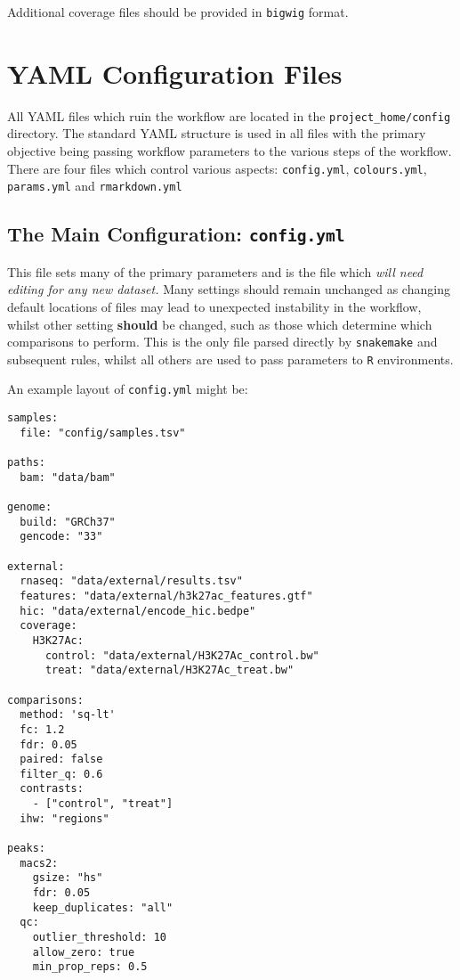 \documentclass[
]{book}
\begin{document}
Additional coverage files should be provided in \texttt{bigwig} format.

\hypertarget{editing-yaml}{%
\chapter{YAML Configuration Files}\label{editing-yaml}}

All YAML files which ruin the workflow are located in the \texttt{project\_home/config} directory.
The standard YAML structure is used in all files with the primary objective being passing workflow parameters to the various steps of the workflow.
There are four files which control various aspects: \texttt{config.yml}, \texttt{colours.yml}, \texttt{params.yml} and \texttt{rmarkdown.yml}

\hypertarget{config-yml}{%
\section{\texorpdfstring{The Main Configuration: \texttt{config.yml}}{The Main Configuration: config.yml}}\label{config-yml}}

This file sets many of the primary parameters and is the file which \emph{will need editing for any new dataset.}
Many settings should remain unchanged as changing default locations of files may lead to unexpected instability in the workflow, whilst other setting \textbf{should} be changed, such as those which determine which comparisons to perform.
This is the only file parsed directly by \texttt{snakemake} and subsequent rules, whilst all others are used to pass parameters to \texttt{R} environments.

An example layout of \texttt{config.yml} might be:

\begin{verbatim}
samples:
  file: "config/samples.tsv"

paths:
  bam: "data/bam"

genome:
  build: "GRCh37"
  gencode: "33"

external:
  rnaseq: "data/external/results.tsv"
  features: "data/external/h3k27ac_features.gtf"
  hic: "data/external/encode_hic.bedpe"
  coverage:
    H3K27Ac:
      control: "data/external/H3K27Ac_control.bw"
      treat: "data/external/H3K27Ac_treat.bw"

comparisons:
  method: 'sq-lt'
  fc: 1.2
  fdr: 0.05
  paired: false
  filter_q: 0.6
  contrasts:
    - ["control", "treat"]
  ihw: "regions"

peaks:
  macs2:
    gsize: "hs"
    fdr: 0.05
    keep_duplicates: "all"
  qc:
    outlier_threshold: 10
    allow_zero: true
    min_prop_reps: 0.5
\end{verbatim}
\end{document}
